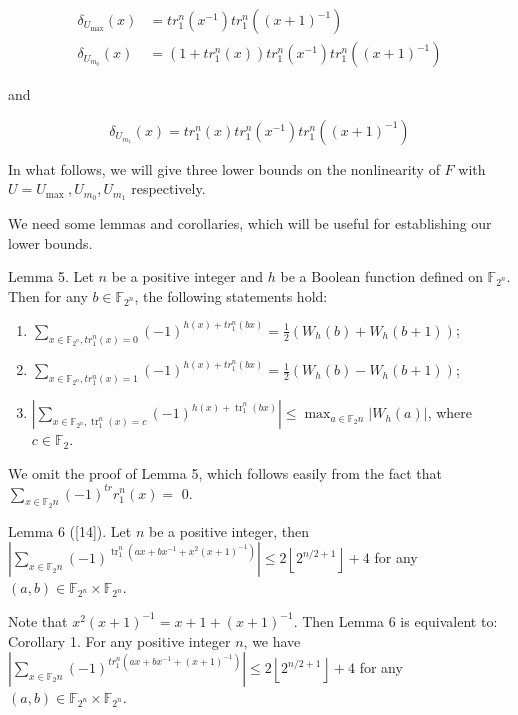 \documentclass[10pt]{article}
\begin{document}
\begin{align*}
\delta_{U_{\max }}(x) & =t r_{1}^{n}\left(x^{-1}\right) t r_{1}^{n}\left((x+1)^{-1}\right)  \tag{7}\\
\delta_{U_{m_{0}}}(x) & =\left(1+t r_{1}^{n}(x)\right) t r_{1}^{n}\left(x^{-1}\right) t r_{1}^{n}\left((x+1)^{-1}\right) \tag{8}
\end{align*}


and


\begin{equation*}
\delta_{U_{m_{1}}}(x)=t r_{1}^{n}(x) t r_{1}^{n}\left(x^{-1}\right) t r_{1}^{n}\left((x+1)^{-1}\right) \tag{9}
\end{equation*}


In what follows, we will give three lower bounds on the nonlinearity of $F$ with $U= U_{\text {max }}, U_{m_{0}}, U_{m_{1}}$ respectively.

We need some lemmas and corollaries, which will be useful for establishing our lower bounds.

Lemma 5. Let $n$ be a positive integer and $h$ be a Boolean function defined on $\mathbb{F}_{2^{n}}$. Then for any $b \in \mathbb{F}_{2^{n}}$, the following statements hold:

\begin{enumerate}
  \item $\sum_{x \in \mathbb{F}_{2^{n}}, t r_{1}^{n}(x)=0}(-1)^{h(x)+t r_{1}^{n}(b x)}=\frac{1}{2}\left(W_{h}(b)+W_{h}(b+1)\right)$;
  \item $\sum_{x \in \mathbb{F}_{2^{n}}, t r_{1}^{n}(x)=1}(-1)^{h(x)+t r_{1}^{n}(b x)}=\frac{1}{2}\left(W_{h}(b)-W_{h}(b+1)\right)$;
  \item $\left|\sum_{x \in \mathbb{F}_{2^{n}}, \operatorname{tr}_{1}^{n}(x)=c}(-1)^{h(x)+\operatorname{tr}_{1}^{n}(b x)}\right| \leq \max _{a \in \mathbb{F}_{2} n}\left|W_{h}(a)\right|$, where $c \in \mathbb{F}_{2}$.
\end{enumerate}

We omit the proof of Lemma 5, which follows easily from the fact that $\sum_{x \in \mathbb{F}_{2} n}(-1)^{t r} r_{1}^{n}(x)=$ 0.

Lemma 6 ([14]). Let $n$ be a positive integer, then $\left|\sum_{x \in \mathbb{F}_{2} n}(-1)^{\operatorname{tr}_{1}^{n}\left(a x+b x^{-1}+x^{2}(x+1)^{-1}\right)}\right| \leq 2\left\lfloor 2^{n / 2+1}\right\rfloor+4$ for any $(a, b) \in \mathbb{F}_{2^{n}} \times \mathbb{F}_{2^{n}}$.

Note that $x^{2}(x+1)^{-1}=x+1+(x+1)^{-1}$. Then Lemma 6 is equivalent to:\\
Corollary 1. For any positive integer $n$, we have $\left|\sum_{x \in \mathbb{F}_{2} n}(-1)^{t r_{1}^{n}\left(a x+b x^{-1}+(x+1)^{-1}\right)}\right| \leq 2\left\lfloor 2^{n / 2+1}\right\rfloor+4$ for any $(a, b) \in \mathbb{F}_{2^{n}} \times \mathbb{F}_{2^{n}}$.
\end{document}
